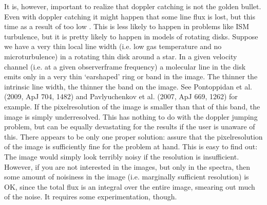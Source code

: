\documentclass[letterpaper,10pt,english]{sphinxmanual}
\begin{document}
It is, however, important to realize that doppler catching is not the golden
bullet. Even with doppler catching it might happen that some line flux is lost,
but this time as a result of too low . This is less likely to
happen in problems like ISM turbulence, but it is pretty likely to happen in
models of rotating disks. Suppose we have a very thin local line width (i.e.
low gas temperature and no microturbulence) in a rotating thin disk around a
star. In a given velocity channel (i.e. at a given observer\sphinxhyphen{}frame frequency) a
molecular line in the disk emits only in a very thin ‘ear\sphinxhyphen{}shaped’ ring or band
in the image. The thinner the intrinsic line width, the thinner the band on the
image. See Pontoppidan et al. (2009, ApJ 704, 1482) and Pavlyuchenkov et
al. (2007, ApJ 669, 1262) for example. If the pixel\sphinxhyphen{}resolution of the image is
smaller than that of this band, the image is simply underresolved.  This has
nothing to do with the doppler jumping problem, but can be equally devastating
for the results if the user is unaware of this. There appears to be only one
proper solution: assure that the pixel\sphinxhyphen{}resolution of the image is sufficiently
fine for the problem at hand. This is easy to find out: The image would simply
look terribly noisy if the resolution is insufficient. However, if you are not
interested in the images, but only in the spectra, then some amount of noisiness
in the image (i.e. marginally sufficient resolution) is OK, since the total
flux is an integral over the entire image, smearing out much of the noise.  It
requires some experimentation, though.
\end{document}
